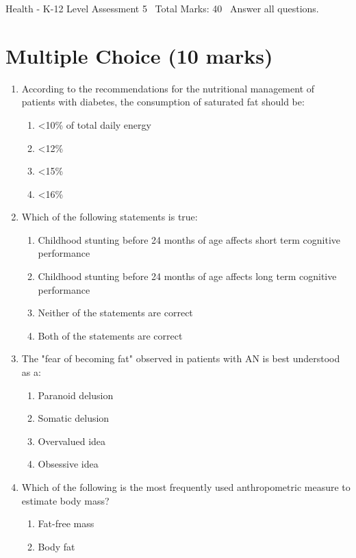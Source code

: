 \documentclass[12pt]{article}
\begin{document}
\begin{center}
Health - K-12 Level Assessment 5 \
Total Marks: 40 \
Answer all questions.
\end{center}

\section*{Multiple Choice (10 marks)}
\begin{enumerate}[label=\arabic*.]
\item According to the recommendations for the nutritional management of patients with diabetes,
the consumption of saturated fat should be:
\begin{enumerate}[label=(\alph*)]
    \item \textless{}10\% of total daily energy
    \item \textless{}12\%
    \item \textless{}15\%
    \item \textless{}16\%
\end{enumerate}
\item Which of the following statements is true:
\begin{enumerate}[label=(\alph*)]
    \item Childhood stunting before 24 months of age affects short term cognitive performance
    \item Childhood stunting before 24 months of age affects long term cognitive performance
    \item Neither of the statements are correct
    \item Both of the statements are correct
\end{enumerate}
\item The "fear of becoming fat" observed in patients with AN is best understood as a:
\begin{enumerate}[label=(\alph*)]
    \item Paranoid delusion
    \item Somatic delusion
    \item Overvalued idea
    \item Obsessive idea
\end{enumerate}
\item Which of the following is the most frequently used anthropometric measure to estimate body
mass?
\begin{enumerate}[label=(\alph*)]
    \item Fat-free mass
    \item Body fat

\end{enumerate}
\end{enumerate}
\end{document}
